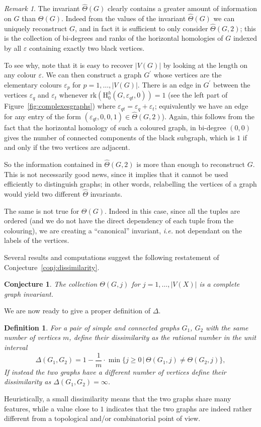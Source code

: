 \documentclass[11pt, a4paper, reqno, twoside, makeidx]{amsart}
\theoremstyle{remark}
\newtheorem{rmk}{Remark}[section]
\theoremstyle{plain}
\newtheorem{defi}[thm]{Definition}
\newtheorem{conj}[thm]{Conjecture}
\theoremstyle{definition}
\newcommand{\HH}{\mathrm{H}}
\begin{document}
\begin{rmk}
The invariant $\widehat{\Theta}(G)$ clearly contains a greater amount of information on $G$ than $\Theta(G)$. Indeed from the values of the invariant  $\widehat{\Theta}(G)$ we can uniquely reconstruct $G$, and in fact it is sufficient to only consider $\widehat{\Theta}(G,2)$; this is the collection of bi-degrees and ranks of the horizontal homologies of $G$ indexed by all $\varepsilon$ containing exactly two black vertices.

To see why, note that it is easy to recover $|V(G)|$ by looking at the length on any colour $\varepsilon$. We can then construct a graph $G^\prime$ whose vertices are the elementary colours $\varepsilon_p$ for $p = 1, \ldots, |V(G)|$. There is an edge in  $G^\prime$ between the vertices $\varepsilon_q$ and $\varepsilon_t$ whenever $\mathrm{rk} (\HH^h_0 (G, \varepsilon_{qt} ,0)) = 1$ (see the left part of Figure~\ref{fig:complexesgraphs}) where $\varepsilon_{qt} = \varepsilon_q + \varepsilon_t$; equivalently we have an edge for any entry of the form $(\varepsilon_{qt}, 0,0,1) \in \widehat{\Theta}(G,2)$). Again, this follows from the fact that the horizontal homology of such a coloured graph, in bi-degree $(0,0)$ gives the number of connected components of the black subgraph, which is $1$ if and only if the two vertices are adjacent.
\end{rmk}
So the information contained in $\widehat{\Theta}(G,2)$ is more than enough to reconstruct $G$. This is not necessarily good news, since it implies that it cannot be used efficiently to distinguish graphs; in other words, relabelling the vertices of a graph would yield two different $\widehat{\Theta}$ invariants.

The same is not true for $\Theta(G)$. Indeed in this case, since all the tuples are ordered (and we do not have the direct dependency of each tuple from the colouring), we are creating a ``canonical'' invariant, \emph{i.e.} not dependant on the labels of the vertices.

Several results and computations suggest the following restatement of Conjecture~\ref{conj:dissimilarity}.
\begin{conj}\label{conj:completegraph}
The collection $\Theta(G,j)$ for $j = 1, \ldots, |V(X)|$ is a complete graph invariant.
\end{conj}
We are now ready to give a proper definition of $\Delta$.
\begin{defi}
For a pair of simple and connected graphs $G_1$, $G_2$ with the same number of vertices $m$, define their \emph{dissimilarity} as the rational number in the unit interval $$\Delta (G_1,G_2) = 1- \frac{1}{m}\cdot\min\{j\ge 0\,|\, \Theta(G_1,j) \neq \Theta(G_2,j) \},$$
If instead the two graphs have a different number of vertices define  their dissimilarity as $\Delta (G_1,G_2) = \infty$.
\end{defi}
Heuristically, a small dissimilarity means that the two graphs share many features, while a value close to $1$ indicates that the two graphs are indeed rather different from a topological and\slash or combinatorial point of view.
\end{document}
